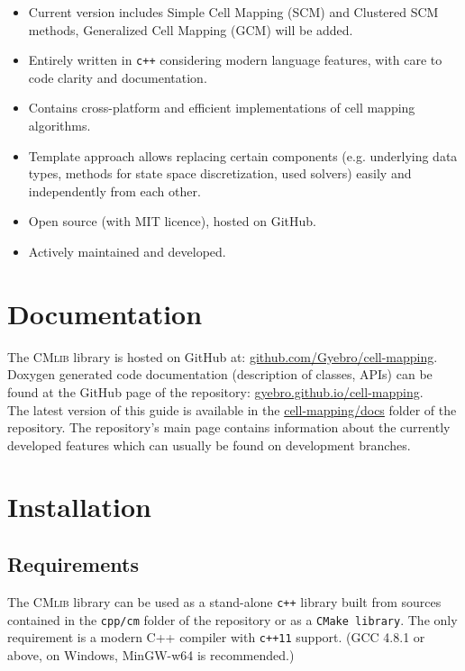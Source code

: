 \documentclass[11pt]{article}
\begin{document}
\begin{itemize}
	\item Current version includes Simple Cell Mapping (SCM) \cite{HSU87} and Clustered SCM \cite{CNSNS16} methods, Generalized Cell Mapping (GCM) will be added.
	\item Entirely written in \texttt{c++} considering modern language features, with care to code clarity and documentation.
	\item Contains cross-platform and efficient implementations of cell mapping algorithms.
	\item Template approach allows replacing certain components (e.g. underlying data types, methods for state space discretization, used solvers) easily and independently from each other.
	\item Open source (with MIT licence), hosted on GitHub.
	\item Actively maintained and developed.
\end{itemize}

\newpage
\section{Documentation}

The \textsc{CMlib} library is hosted on GitHub at: \href{https://github.com/Gyebro/cell-mapping}{github.com/Gyebro/cell-mapping}.\\
Doxygen generated code documentation (description of classes, APIs) can be found at the GitHub page of the repository: \href{https://gyebro.github.io/cell-mapping}{gyebro.github.io/cell-mapping}.\\
The latest version of this guide is available in the  \href{https://github.com/Gyebro/cell-mapping/blob/master/docs/tex/cell-mapping-cpp.pdf}{cell-mapping/docs} folder of the repository.
The repository's main page contains information about the currently developed features which can usually be found on development branches.

\section{Installation}

\subsection{Requirements}

The \textsc{CMlib} library can be used as a stand-alone \texttt{c++} library built from sources contained in the \texttt{cpp/cm} folder of the repository or as a \texttt{CMake library}. The only requirement is a modern C++ compiler with \texttt{c++11} support. (GCC 4.8.1 or above, on Windows, MinGW-w64 is recommended.)
\end{document}
